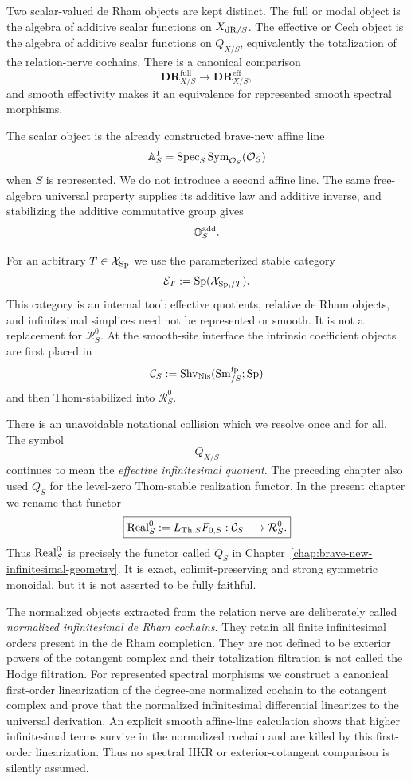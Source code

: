 Two scalar-valued de Rham objects are kept distinct.  The full or modal object
is the algebra of additive scalar functions on \(X_{\mathrm{dR}/S}\).  The effective
or \v{C}ech object is the algebra of additive scalar functions on
\(Q_{X/S}\), equivalently the totalization of the relation-nerve cochains.
There is a canonical comparison
\[
    \mathbf{DR}^{\mathrm{full}}_{X/S}
    \longrightarrow
    \mathbf{DR}^{\mathrm{eff}}_{X/S},
\]
and smooth effectivity makes it an equivalence for represented smooth spectral
morphisms.

The scalar object is the already constructed brave-new affine line
\[
    \mathbb A^1_S
    =
    \operatorname{Spec}_S\operatorname{Sym}_{\mathcal O_S}(\mathcal O_S)
\]
when \(S\) is represented.  We do not introduce a second affine line.  The
same free-algebra universal property supplies its additive law and additive
inverse, and stabilizing the additive commutative group gives
\[
    \mathbb O_S^{\mathrm{add}}.
\]

For an arbitrary \(T\in\mathcal X_{\mathrm{Sp}}\) we use the parameterized stable
category
\[
    \mathcal E_T:=\mathrm{Sp}(\mathcal X_{\mathrm{Sp},/T}).
\]
This category is an internal tool: effective quotients, relative de Rham
objects, and infinitesimal simplices need not be represented or smooth.  It is
not a replacement for \(\mathcal R_S^0\).  At the smooth-site interface the
intrinsic coefficient objects are first placed in
\[
    \mathcal C_S
    :=
    \mathrm{Shv}_{\mathrm{Nis}}(\operatorname{Sm}^{\mathrm{fp}}_{/S};\mathrm{Sp})
\]
and then Thom-stabilized into \(\mathcal R_S^0\).

There is an unavoidable notational collision which we resolve once and for
all.  The symbol
\[
    Q_{X/S}
\]
continues to mean the \emph{effective infinitesimal quotient}.  The preceding
chapter also used \(Q_S\) for the level-zero Thom-stable realization functor.
In the present chapter we rename that functor
\[
\boxed{
    \operatorname{Real}^{0}_S
    :=
    L_{\mathrm{Th},S}F_{0,S}:
    \mathcal C_S\longrightarrow\mathcal R_S^0.
}
\]
Thus \(\operatorname{Real}^{0}_S\) is precisely the functor called \(Q_S\) in
Chapter~\ref{chap:brave-new-infinitesimal-geometry}.  It is exact,
colimit-preserving and strong symmetric monoidal, but it is not asserted to
be fully faithful.

The normalized objects extracted from the relation nerve are deliberately
called \emph{normalized infinitesimal de Rham cochains}.  They retain all
finite infinitesimal orders present in the de Rham completion.  They are not
defined to be exterior powers of the cotangent complex and their totalization
filtration is not called the Hodge filtration.  For represented spectral
morphisms we construct a canonical first-order linearization of the degree-one
normalized cochain to the cotangent complex and prove that the normalized
infinitesimal differential linearizes to the universal derivation.  An
explicit smooth affine-line calculation shows that higher infinitesimal terms
survive in the normalized cochain and are killed by this first-order
linearization.  Thus no spectral HKR or exterior-cotangent comparison is
silently assumed.

